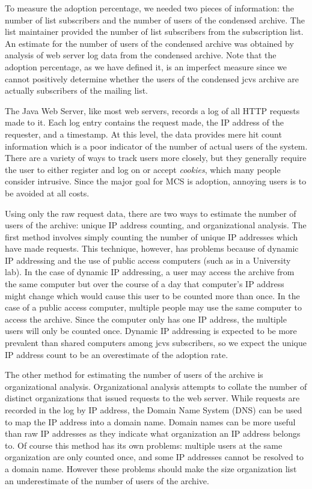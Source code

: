 To measure the adoption percentage, we needed two pieces of information: the
number of list subscribers and the number of users of the condensed archive.
The list maintainer provided the number of list subscribers from the
subscription list. An estimate for the number of users of the condensed archive
was obtained by analysis of web server log data from the condensed archive.
Note that the adoption percentage, as we have defined it, is an imperfect
measure since we cannot positively determine whether the users of the condensed
jcvs archive are actually subscribers of the mailing list.

The Java Web Server, like most web servers, records a log of all HTTP
\cite{rfc-http} requests made to it. Each log entry contains the request made,
the IP address of the requester, and a timestamp. At this level, the data
provides mere hit count information which is a poor indicator of the number of
actual users of the system. There are a variety of ways to track users more
closely, but they generally require the user to either register and log on or
accept {\it cookies}, which many people consider intrusive. Since the major
goal for MCS is adoption, annoying users is to be avoided at all costs.

Using only the raw request data, there are two ways to estimate the number of
users of the archive: unique IP address counting, and organizational analysis.
The first method involves simply counting the number of unique IP addresses
which have made requests. This technique, however, has problems because of
dynamic IP addressing and the use of public access computers (such as in a
University lab). In the case of dynamic IP addressing, a user may access the
archive from the same computer but over the course of a day that computer's IP
address might change which would cause this user to be counted more than once.
In the case of a public access computer, multiple people may use the same
computer to access the archive. Since the computer only has one IP address, the
multiple users will only be counted once.  Dynamic IP addressing is expected to
be more prevalent than shared computers among jcvs subscribers, so we expect
the unique IP address count to be an overestimate of the adoption rate.

The other method for estimating the number of users of the archive is
organizational analysis. Organizational analysis attempts to collate the number
of distinct organizations that issued requests to the web server. While
requests are recorded in the log by IP address, the Domain Name System (DNS)
can be used to map the IP address into a domain name. Domain names can be more
useful than raw IP addresses as they indicate what organization an IP address
belongs to. Of course this method has its own problems: multiple users at the
same organization are only counted once, and some IP addresses cannot be
resolved to a domain name. However these problems should make the size
organization list an underestimate of the number of users of the archive.

